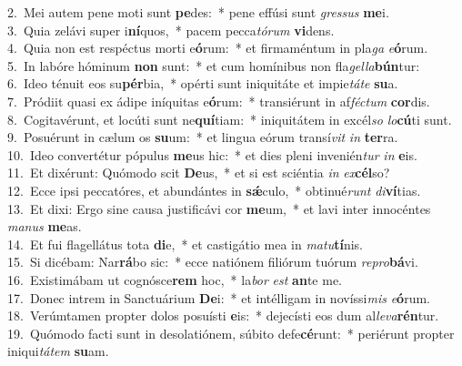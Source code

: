 {2.~}Mei autem pene moti sunt \textbf{pe}des:~* pene effúsi sunt \textit{gres}\textit{sus} \textbf{me}i.\\
{3.~}Quia zelávi super i\textbf{ní}quos,~* pacem pecca\textit{tó}\textit{rum} \textbf{vi}dens.\\
{4.~}Quia non est respéctus morti e\textbf{ó}rum:~* et firmaméntum in pla\textit{ga} \textit{e}\textbf{ó}rum.\\
{5.~}In labóre hóminum \textbf{non} sunt:~* et cum homínibus non fla\textit{gel}\textit{la}\textbf{bún}tur:\\
{6.~}Ideo ténuit eos su\textbf{pér}bia,~* opérti sunt iniquitáte et impie\textit{tá}\textit{te} \textbf{su}a.\\
{7.~}Pródiit quasi ex ádipe iníquitas e\textbf{ó}rum:~* transiérunt in af\textit{fé}\textit{ctum} \textbf{cor}dis.\\
{8.~}Cogitavérunt, et locúti sunt ne\textbf{quí}tiam:~* iniquitátem in excél\textit{so} \textit{lo}\textbf{cú}ti sunt.\\
{9.~}Posuérunt in cælum os \textbf{su}um:~* et lingua eórum transí\textit{vit} \textit{in} \textbf{ter}ra.\\
{10.~}Ideo convertétur pópulus \textbf{me}us hic:~* et dies pleni invenién\textit{tur} \textit{in} \textbf{e}is.\\
{11.~}Et dixérunt: Quómodo scit \textbf{De}us,~* et si est sciéntia \textit{in} \textit{ex}\textbf{cél}so?\\
{12.~}Ecce ipsi peccatóres, et abundántes in \textbf{sǽ}culo,~* obtinué\textit{runt} \textit{di}\textbf{ví}tias.\\
{13.~}Et dixi: Ergo sine causa justificávi cor \textbf{me}um,~* et lavi inter innocéntes \textit{ma}\textit{nus} \textbf{me}as.\\
{14.~}Et fui flagellátus tota \textbf{di}e,~* et castigátio mea in \textit{ma}\textit{tu}\textbf{tí}nis.\\
{15.~}Si dicébam: Nar\textbf{rá}bo sic:~* ecce natiónem filiórum tuórum \textit{re}\textit{pro}\textbf{bá}vi.\\
{16.~}Existimábam ut cognósce\textbf{rem} hoc,~* la\textit{bor} \textit{est} \textbf{an}te me.\\
{17.~}Donec intrem in Sanctuárium \textbf{De}i:~* et intélligam in novíssi\textit{mis} \textit{e}\textbf{ó}rum.\\
{18.~}Verúmtamen propter dolos posuísti \textbf{e}is:~* dejecísti eos dum al\textit{le}\textit{va}\textbf{rén}tur.\\
{19.~}Quómodo facti sunt in desolatiónem, súbito defe\textbf{cé}runt:~* periérunt propter iniqui\textit{tá}\textit{tem} \textbf{su}am.\\
